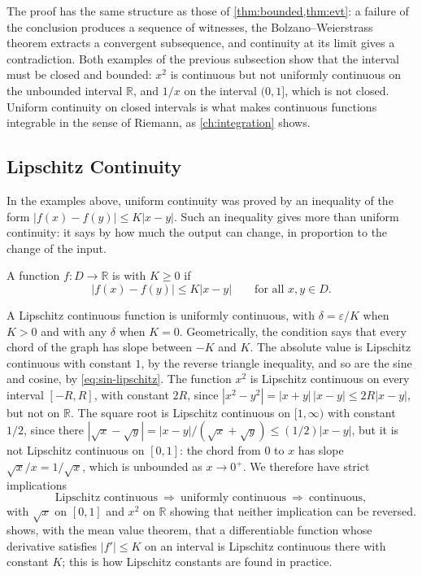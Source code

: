 The proof has the same structure as those of \cref{thm:bounded,thm:evt}: a failure of the conclusion produces a sequence of witnesses, the Bolzano--Weierstrass theorem extracts a convergent subsequence, and continuity at its limit gives a contradiction. Both examples of the previous subsection show that the interval must be closed and bounded: $x^2$ is continuous but not uniformly continuous on the unbounded interval $\mathbb R$, and $1/x$ on the interval $(0,1]$, which is not closed. Uniform continuity on closed intervals is what makes continuous functions integrable in the sense of Riemann, as \cref{ch:integration} shows.

\subsection{Lipschitz Continuity}

In the examples above, uniform continuity was proved by an inequality of the form $|f(x)-f(y)|\le K|x-y|$. Such an inequality gives more than uniform continuity: it says by how much the output can change, in proportion to the change of the input.

\begin{definition}
\label{def:lipschitz}
A function $f\colon D\to\mathbb R$ is  with  $K\ge0$ if
\[
|f(x)-f(y)|\le K|x-y|\qquad\text{for all }x,y\in D .
\]
\end{definition}

A Lipschitz continuous function is uniformly continuous, with $\delta=\varepsilon/K$ when $K>0$ and with any $\delta$ when $K=0$. Geometrically, the condition says that every chord of the graph has slope between $-K$ and $K$. The absolute value is Lipschitz continuous with constant $1$, by the reverse triangle inequality, and so are the sine and cosine, by \eqref{eq:sin-lipschitz}. The function $x^2$ is Lipschitz continuous on every interval $[-R,R]$, with constant $2R$, since $|x^2-y^2|=|x+y|\,|x-y|\le2R|x-y|$, but not on $\mathbb R$. The square root is Lipschitz continuous on $[1,\infty)$ with constant $1/2$, since there $|\sqrt x-\sqrt y|=|x-y|/(\sqrt x+\sqrt y)\le(1/2)|x-y|$, but it is not Lipschitz continuous on $[0,1]$: the chord from $0$ to $x$ has slope $\sqrt x/x=1/\sqrt x$, which is unbounded as $x\to0^+$. We therefore have strict implications
\[
\text{Lipschitz continuous}\ \Longrightarrow\ \text{uniformly continuous}\ \Longrightarrow\ \text{continuous},
\]
with $\sqrt x$ on $[0,1]$ and $x^2$ on $\mathbb R$ showing that neither implication can be reversed.  shows, with the mean value theorem, that a differentiable function whose derivative satisfies $|f'|\le K$ on an interval is Lipschitz continuous there with constant $K$; this is how Lipschitz constants are found in practice.

